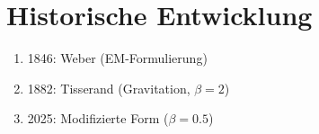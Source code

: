 \section{Historische Entwicklung}
\begin{enumerate}
    \item 1846: Weber (EM-Formulierung)
    \item 1882: Tisserand (Gravitation, $\beta=2$)
    \item 2025: Modifizierte Form ($\beta=0.5$)
\end{enumerate}